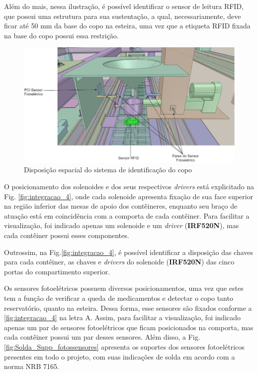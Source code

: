     \hspace{5cm}
    
    Além do mais, nessa ilustração, é possível identificar o sensor de leitura RFID, que possui uma estrutura para sua sustentação, a qual, necessariamente, deve ficar até 50 mm da base do copo na esteira, uma vez que a etiqueta RFID fixada na base do copo possui essa restrição.  
    
    \begin{figure}[H]
        \centering
        \includegraphics[width=1\textwidth]{figuras/integracao/integracao_5.png} 
        \caption{Disposição espacial do sistema de identificação do copo}
        \label{fig:integracao_5}
    \end{figure}
    
    
    O posicionamento dos solenoides e dos seus respectivos \textit{drivers} está explicitado na Fig. \ref{fig:integracao_4}, onde cada solenoide apresenta fixação de sua face superior na região inferior das mesas de apoio dos contêineres, enquanto seu braço de atuação está em coincidência com a comporta de cada contêiner. Para facilitar a visualização, foi indicado apenas um solenoide e um \textit{driver} (\textbf{IRF520N}), mas cada contêiner possui esses componentes. 
    
    Outrossim, na Fig.\ref{fig:integracao_4}, é possível identificar a disposição das chaves para cada contêiner, as chaves e \textit{drivers} do solenoide (\textbf{IRF520N}) das cinco portas do compartimento superior.
     
    Os sensores fotoelétricos possuem diversos posicionamentos, uma vez que estes tem a função de verificar a queda de medicamentos e detectar o copo tanto reservatório, quanto na esteira. Dessa forma, esse sensores são fixados conforme a \ref{fig:integracao_4} na letra A. Assim, para facilitar a visualização, foi indicado apenas um par de sensores fotoelétricos que ficam posicionados na comporta, mas cada contêiner possui um par desses sensores. Além disso, a Fig.\ref{fig:Solda_Supp_fotossensores} apresenta os suportes dos sensores fotoelétricos presentes em todo o projeto, com suas indicações de solda em acordo com a norma NRB 7165.
    
